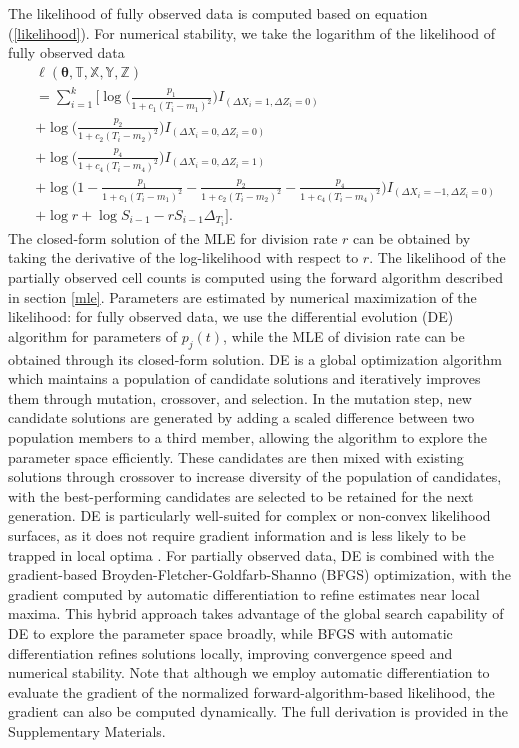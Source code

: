 \documentclass[pdflatex,sn-mathphys-num]{sn-jnl}
\theoremstyle{thmstyleone}%
\theoremstyle{thmstyletwo}%
\theoremstyle{thmstylethree}%
\begin{document}
The likelihood of fully observed data is computed based on equation (\ref{likelihood}). For numerical stability, we take the logarithm of the likelihood of fully observed data
\begin{equation*}
    \begin{split}
        & \ell(\boldsymbol{\theta},\mathbb{T}, \mathbb{X}, \mathbb{Y}, \mathbb{Z}) \\
        &= \sum_{i=1}^k \Big[ \log \Big(\frac{p_1}{1+c_1(T_i-m_1)^2}\Big) I_{(\Delta X_i = 1, \Delta Z_i = 0)} \\
        & + \log \Big(\frac{p_2}{1+c_2(T_i-m_2)^2}\Big) I_{(\Delta X_i = 0,\Delta Z_i = 0)} \\
        & + \log \Big(\frac{p_4}{1+c_4(T_i-m_4)^2}\Big) I_{(\Delta X_i = 0,\Delta Z_i = 1)} \\
        & + \log \Big(1- \frac{p_1}{1+c_1(T_i-m_1)^2}- \frac{p_2}{1+c_2(T_i-m_2)^2} - \frac{p_4}{1+c_4 (T_i-m_4)^2} \Big) I_{(\Delta X_i = -1,\Delta Z_i = 0)} \\
        & + \log r + \log S_{i-1} - rS_{i-1}\Delta_{T_i} \Big].
    \end{split}
\end{equation*}
The closed-form solution of the MLE for division rate $r$ can be obtained by taking the derivative of the log-likelihood with respect to $r$. The likelihood of the partially observed cell counts is computed using the forward algorithm described in section \ref{mle}. Parameters are estimated by numerical maximization of the likelihood: for fully observed data, we use the differential evolution (DE) algorithm for parameters of $p_j(t)$, while the MLE of division rate can be obtained through its closed-form solution. DE is a global optimization algorithm which maintains a population of candidate solutions and iteratively improves them through mutation, crossover, and selection. In the mutation step, new candidate solutions are generated by adding a scaled difference between two population members to a third member, allowing the algorithm to explore the parameter space efficiently. These candidates are then mixed with existing solutions through crossover to increase diversity of the population of candidates, with the best-performing candidates are selected to be retained for the next generation. DE is particularly well-suited for complex or non-convex likelihood surfaces, as it does not require gradient information and is less likely to be trapped in local optima \cite{storn1997differential, ardia2011differential, mullen2011deoptim}. For partially observed data, DE is combined with the gradient-based Broyden-Fletcher-Goldfarb-Shanno (BFGS) optimization, with the gradient computed by automatic differentiation \cite{fournier2012ad, kristensen2016tmb} to refine estimates near local maxima. This hybrid approach takes advantage of the global search capability of DE to explore the parameter space broadly, while BFGS with automatic differentiation refines solutions locally, improving convergence speed and numerical stability. Note that although we employ automatic differentiation to evaluate the gradient of the normalized forward-algorithm-based likelihood, the gradient can also be computed dynamically. The full derivation is provided in the Supplementary Materials.
\end{document}
